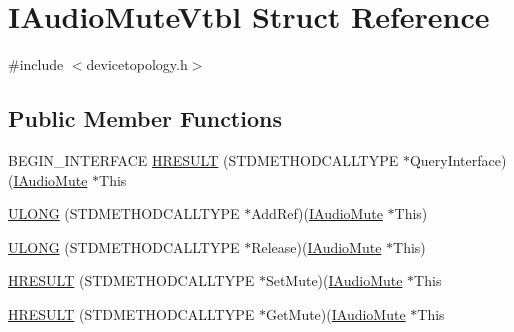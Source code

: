 \hypertarget{struct_i_audio_mute_vtbl}{}\section{I\+Audio\+Mute\+Vtbl Struct Reference}
\label{struct_i_audio_mute_vtbl}


{\ttfamily \#include $<$devicetopology.\+h$>$}

\subsection*{Public Member Functions}
\begin{DoxyCompactItemize}
\item 
B\+E\+G\+I\+N\+\_\+\+I\+N\+T\+E\+R\+F\+A\+CE \hyperlink{struct_i_audio_mute_vtbl_a04e447fd31ed16e1b20be6465347ecad}{H\+R\+E\+S\+U\+LT} (S\+T\+D\+M\+E\+T\+H\+O\+D\+C\+A\+L\+L\+T\+Y\+PE $\ast$Query\+Interface)(\hyperlink{devicetopology_8h_a445bb90c3d0c281b1295440bbb25e959}{I\+Audio\+Mute} $\ast$This
\item 
\hyperlink{struct_i_audio_mute_vtbl_a8f53db2d8e6fffbb0c1efd1ad0bffee6}{U\+L\+O\+NG} (S\+T\+D\+M\+E\+T\+H\+O\+D\+C\+A\+L\+L\+T\+Y\+PE $\ast$Add\+Ref)(\hyperlink{devicetopology_8h_a445bb90c3d0c281b1295440bbb25e959}{I\+Audio\+Mute} $\ast$This)
\item 
\hyperlink{struct_i_audio_mute_vtbl_a47cf9b570a981947b1d15e14b64f4e52}{U\+L\+O\+NG} (S\+T\+D\+M\+E\+T\+H\+O\+D\+C\+A\+L\+L\+T\+Y\+PE $\ast$Release)(\hyperlink{devicetopology_8h_a445bb90c3d0c281b1295440bbb25e959}{I\+Audio\+Mute} $\ast$This)
\item 
\hyperlink{struct_i_audio_mute_vtbl_aefe2b705fa324dd1a96fab70758f7c79}{H\+R\+E\+S\+U\+LT} (S\+T\+D\+M\+E\+T\+H\+O\+D\+C\+A\+L\+L\+T\+Y\+PE $\ast$Set\+Mute)(\hyperlink{devicetopology_8h_a445bb90c3d0c281b1295440bbb25e959}{I\+Audio\+Mute} $\ast$This
\item 
\hyperlink{struct_i_audio_mute_vtbl_af43d60d22d78cdfef29a52fcede3b5be}{H\+R\+E\+S\+U\+LT} (S\+T\+D\+M\+E\+T\+H\+O\+D\+C\+A\+L\+L\+T\+Y\+PE $\ast$Get\+Mute)(\hyperlink{devicetopology_8h_a445bb90c3d0c281b1295440bbb25e959}{I\+Audio\+Mute} $\ast$This
\end{DoxyCompactItemize}
